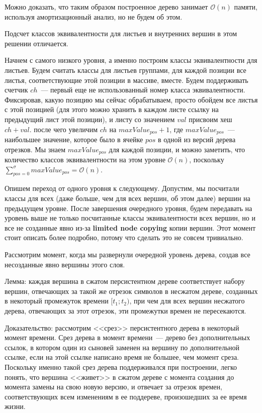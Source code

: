 Можно доказать, что таким образом построенное дерево занимает $\mathcal{O}(n)$ памяти, используя амортизационный анализ, но не будем об этом. 

Подсчет классов эквивалентности для листьев и внутренних вершин в этом решении отличается.

Начнем с самого низкого уровня, а именно построим классы эквивалентности для листьев. Будем считать классы для листьев группами, для каждой позиции все листья, соответствующие этой позиции в массиве, вместе. Будем поддерживать счетчик $ch$~--- первый еще не использованный номер класса эквивалентности. Фиксировав, какую позицию мы сейчас обрабатываем, просто обойдем все листья с этой позицией (для этого можно хранить в каждом листе ссылку на предыдущий лист этой позиции), и листу со значением $val$ присвоим хеш $ch+val$. после чего увеличим $ch$ на $maxValue_{pos}+1$, где $maxValue_{pos}$~--- наибольшее значение, которое было в ячейке $pos$ в одной из версий дерева отрезков. Мы знаем $maxValue_{pos}$ для каждой позиции, и можно заметить, что количество классов эквивалентности на этом уровне $\mathcal{O}(n)$, поскольку $\sum \limits_{pos=0}^{\sigma} maxValue_{pos} = \mathcal{O}(n)$.

Опишем переход от одного уровня к следующему. Допустим, мы посчитали классы для всех (даже больше, чем для всех вершин, об этом далее) вершин на предыдущем уровне. После завершения очередного уровня, будем передавать на уровень выше не только посчитанные классы эквивалентности всех вершин, но и все не созданные явно из-за \textbf{limited node copying} копии вершин. Этот момент стоит описать более подробно, потому что сделать это не совсем тривиально. 

Рассмотрим момент, когда мы развернули очередной уровень дерева, создав все несозданные явно вершины этого слоя.

Лемма: каждая вершина в сжатом персистентном дереве соответствует набору вершин, отвечающих за такой же отрезок символов в несжатом дереве, созданных в некоторый промежуток времени $[t_1; t_2)$, при чем для всех вершин несжатого дерева, отвечающих за этот отрезок, эти промежутки времен не пересекаются.

Доказательство: рассмотрим <<срез>> персистентного дерева в некоторый момент времени. Срез дерева в момент времени~--- дерево без дополнительных ссылок, в котором один из сыновей заменен на вершину по дополнительной ссылке, если на этой ссылке написано время не большее, чем момент среза. Поскольку именно такой срез дерева поддерживался при построении, легко понять, что вершина <<живет>> в сжатом дереве с момента создания до момента замены на свою новую версию, и отвечает за отрезок времен, соответствующих всем изменениям в ее поддереве, произошедших за ее время жизни.

